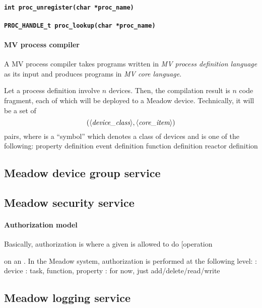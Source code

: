 \documentclass{note}
\begin{document}
{\paragraph{\small\textcolor{red2}{\tt{}int proc\_unregister(char *proc\_name)}}
\paragraph{\small\textcolor{red2}{\tt{}PROC\_HANDLE\_t proc\_lookup(char *proc\_name)}}

\paragraph{MV process compiler}
A MV process compiler takes programs written in \textcolor{red2}{\em
  MV process definition language\/} as its input and produces  
programs in {\em MV core language}. 

Let a process definition involve $n$ devices. 
Then, the compilation result is $n$ code fragment, each of which will be
deployed to a Meadow device. Technically, it will be a set of 
   \[ (\textrm{\mbox{$\langle{\textit{device\_class}}\rangle$}}, \textrm{\mbox{$\langle{\textit{core\_item}}\rangle$}})\]
pairs, where  is a ``symbol'' which denotes a class of
devices and  is one of the following:
\bit
\w property definition
\w event definition
\w function definition
\w reactor definition
\eit

\subsection{Meadow device group service}

\subsection{Meadow security service}
\paragraph{Authorization model}
Basically, authorization is where a given  is allowed to do
\bb[operation} on an .
In the Meadow system, authorization is performed at the following level:
\bit
\w {}: device
\w {}: task, function, property
\w {}: for now, just add/delete/read/write
\eit


\subsection{Meadow logging service}
\end{document}
